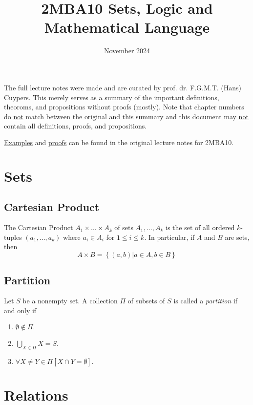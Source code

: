\documentclass[fleqn]{article}
\author{}
\title{2MBA10 Sets, Logic and Mathematical Language}
\date{November 2024}
\begin{document}
\large
\maketitle
\vspace{-4em}


The full lecture notes were made and are curated by prof. dr. F.G.M.T. (Hans) Cuypers. This merely
serves as a summary of the important definitions, theoroms, and propositions
without proofs (mostly). Note that chapter numbers do \underline{not} match between
the original and this summary and this document may \underline{not} contain
all definitions, proofs, and propositions.


\underline{Examples} and \underline{proofs} can be found in the original lecture notes for 2MBA10.

\section{Sets}
\subsection{Cartesian Product}
The Cartesian Product $A_1 \times \dots \times A_k$ of sets $A_1, \dots, A_k$
is the set of all ordered $k$-tuples $(a_1, \dots, a_k)$ where $a_i \in A_i$ for $1 \leq i \leq k$.
In particular, if $A$ and $B$ are sets, then
\begin{equation*}
    A \times B = \left\{ (a,b) | a \in A, b \in B \right\}
\end{equation*}

\subsection{Partition}
Let $S$ be a nonempty set. A collection $\Pi$ of subsets of $S$ is called a \textit{partition}
if and only if
\begin{enumerate}
    \item $\emptyset \notin \Pi$.
    \item $\bigcup_{X\in\Pi} X = S$.
    \item $\forall X \neq Y \in \Pi \left[ X \cap Y = \emptyset \right]$.
\end{enumerate}

\section{Relations}
\end{document}
